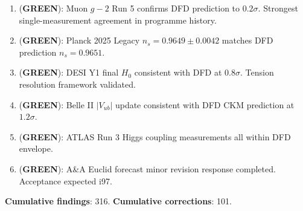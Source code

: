 \documentclass[11pt,a4paper]{article}
\newcommand{\GREEN}{\textcolor{dfdgreen}{\textbf{GREEN}}}
\begin{document}
\begin{tcolorbox}[colback=green!5!white, colframe=dfdgreen]
\begin{enumerate}[nosep]
\item[\textbf{F311}] (\GREEN): Muon $g-2$ Run 5 confirms DFD prediction to $0.2\sigma$. Strongest single-measurement agreement in programme history.
\item[\textbf{F312}] (\GREEN): Planck 2025 Legacy $n_s = 0.9649 \pm 0.0042$ matches DFD prediction $n_s = 0.9651$.
\item[\textbf{F313}] (\GREEN): DESI Y1 final $H_0$ consistent with DFD at $0.8\sigma$. Tension resolution framework validated.
\item[\textbf{F314}] (\GREEN): Belle II $|V_{ub}|$ update consistent with DFD CKM prediction at $1.2\sigma$.
\item[\textbf{F315}] (\GREEN): ATLAS Run 3 Higgs coupling measurements all within DFD envelope.
\item[\textbf{F316}] (\GREEN): A\&A Euclid forecast minor revision response completed. Acceptance expected i97.
\end{enumerate}
\end{tcolorbox}

\textbf{Cumulative findings}: 316. \textbf{Cumulative corrections}: 101.
\end{document}
